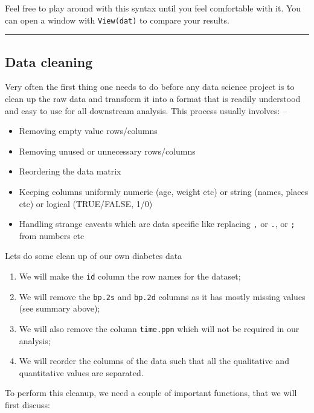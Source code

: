 \documentclass[
]{book}
\providecommand{\tightlist}{%
  \setlength{\itemsep}{0pt}\setlength{\parskip}{0pt}}
\begin{document}
Feel free to play around with this syntax until you feel comfortable with it.
You can open a window with \texttt{View(dat)} to compare your results.

\begin{center}\rule{0.5\linewidth}{0.5pt}\end{center}

\hypertarget{data-cleaning}{%
\subsection{Data cleaning}\label{data-cleaning}}

Very often the first thing one needs to do before any data science project is to clean up the raw data and transform it into a format that is readily understood and easy to use for all downstream analysis.
This process usually involves: --

\begin{itemize}
\tightlist
\item
  Removing empty value rows/columns
\item
  Removing unused or unnecessary rows/columns
\item
  Reordering the data matrix
\item
  Keeping columns uniformly numeric (age, weight etc) or string (names, places etc) or logical (TRUE/FALSE, 1/0)
\item
  Handling strange caveats which are data specific like replacing \texttt{,} or \texttt{.}, or \texttt{;} from numbers etc
\end{itemize}

Lets do some clean up of our own diabetes data

\begin{enumerate}
\def\labelenumi{\arabic{enumi}.}
\tightlist
\item
  We will make the \texttt{id} column the row names for the dataset;
\item
  We will remove the \texttt{bp.2s} and \texttt{bp.2d} columns as it has mostly missing values (see summary above);
\item
  We will also remove the column \texttt{time.ppn} which will not be required in our analysis;
\item
  We will reorder the columns of the data such that all the qualitative and quantitative values are separated.
\end{enumerate}

To perform this cleanup, we need a couple of important functions, that we will first discuss:
\end{document}
